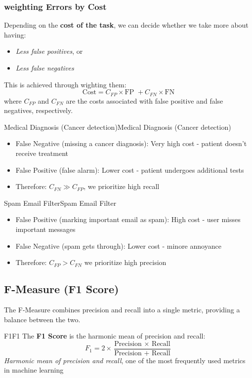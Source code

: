 \documentclass[a4paper]{article}
\theoremstyle{definition}
\begin{document}
\subsubsection{weighting Errors by Cost}
Depending on the \textbf{cost of the task}, we can decide whether we take 
more about having:
\begin{itemize}
    \item \textit{Less false positives}, or
    \item \textit{Less false negatives}
\end{itemize}
This is achieved through wighting them:
\[
  \text{Cost} = C_{FP} \times \text{FP } + C_{FN} \times \text{FN}
\]
where \( C_{FP} \) and \( C_{FN} \) are the costs associated with false positive and false negatives, respectively.
\begin{example}{Medical Diagnosis (Cancer detection)}{Medical Diagnosis (Cancer detection)} 
\begin{itemize}
    \item False Negative (missing a cancer diagnosis): Very high cost - patient doesn't receive treatment 
    \item False Positive (false alarm): Lower cost - patient undergoes additional tests 
    \item Therefore: \( C_{FN} \gg C_{FP} \), we prioritize high recall
\end{itemize}    
\end{example}
\begin{example}{Spam Email Filter}{Spam Email Filter}
\centering 
\begin{itemize}
    \item False Positive (marking important email as spam): High cost - user misses important messages 
    \item False Negative (spam gets through): Lower cost - minore annoyance 
    \item Therefore: \( C_{FP} > C_{FN} \) we prioritize high precision
\end{itemize}
\end{example}
\subsection{F-Measure (F1 Score)}
The F-Measure combines precision and recall into a single metric, providing a balance between 
the two.
\begin{definition}{F1}{F1}
The \textbf{F1 Score} is the harmonic mean of precision and recall:
\[
  F_1 = 2 \times \frac{\text{Precision } \times \text{ Recall}}{\text{Precision } + \text{ Recall}}
\]
\textit{Harmonic mean of precision and recall}, one of the most frequently used metrics in machine learning
\end{definition}
\end{document}
